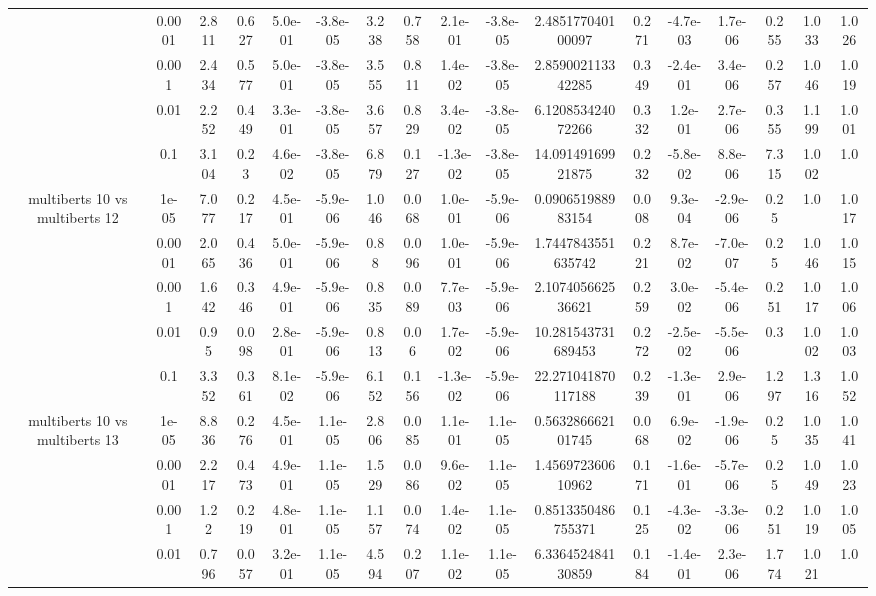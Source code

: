 \begin{tabular}{|c|c|c|c|c|c|c|c|c|c|c|c|c|c|c|c|c|}
 & 0.0001 & 2.811 & 0.627 & 5.0e-01 & -3.8e-05 & 3.238 & 0.758 & 2.1e-01 & -3.8e-05 & 2.485177040100097 & 0.271 & -4.7e-03 & 1.7e-06 & 0.255 & 1.033 & 1.026 \\
 & 0.001 & 2.434 & 0.577 & 5.0e-01 & -3.8e-05 & 3.555 & 0.811 & 1.4e-02 & -3.8e-05 & 2.859002113342285 & 0.349 & -2.4e-01 & 3.4e-06 & 0.257 & 1.046 & 1.019 \\
 & 0.01 & 2.252 & 0.449 & 3.3e-01 & -3.8e-05 & 3.657 & 0.829 & 3.4e-02 & -3.8e-05 & 6.120853424072266 & 0.332 & 1.2e-01 & 2.7e-06 & 0.355 & 1.199 & 1.001 \\
 & 0.1 & 3.104 & 0.23 & 4.6e-02 & -3.8e-05 & 6.879 & 0.127 & -1.3e-02 & -3.8e-05 & 14.09149169921875 & 0.232 & -5.8e-02 & 8.8e-06 & 7.315 & 1.002 & 1.0 \\
\hline
\multirow{5}{*}{multiberts 10 vs multiberts 12} & 1e-05 & 7.077 & 0.217 & 4.5e-01 & -5.9e-06 & 1.046 & 0.068 & 1.0e-01 & -5.9e-06 & 0.090651988983154 & 0.008 & 9.3e-04 & -2.9e-06 & 0.25 & 1.0 & 1.017 \\
 & 0.0001 & 2.065 & 0.436 & 5.0e-01 & -5.9e-06 & 0.88 & 0.096 & 1.0e-01 & -5.9e-06 & 1.7447843551635742 & 0.221 & 8.7e-02 & -7.0e-07 & 0.25 & 1.046 & 1.015 \\
 & 0.001 & 1.642 & 0.346 & 4.9e-01 & -5.9e-06 & 0.835 & 0.089 & 7.7e-03 & -5.9e-06 & 2.107405662536621 & 0.259 & 3.0e-02 & -5.4e-06 & 0.251 & 1.017 & 1.006 \\
 & 0.01 & 0.95 & 0.098 & 2.8e-01 & -5.9e-06 & 0.813 & 0.06 & 1.7e-02 & -5.9e-06 & 10.281543731689453 & 0.272 & -2.5e-02 & -5.5e-06 & 0.3 & 1.002 & 1.003 \\
 & 0.1 & 3.352 & 0.361 & 8.1e-02 & -5.9e-06 & 6.152 & 0.156 & -1.3e-02 & -5.9e-06 & 22.271041870117188 & 0.239 & -1.3e-01 & 2.9e-06 & 1.297 & 1.316 & 1.052 \\
\hline
\multirow{5}{*}{multiberts 10 vs multiberts 13} & 1e-05 & 8.836 & 0.276 & 4.5e-01 & 1.1e-05 & 2.806 & 0.085 & 1.1e-01 & 1.1e-05 & 0.563286662101745 & 0.068 & 6.9e-02 & -1.9e-06 & 0.25 & 1.035 & 1.041 \\
 & 0.0001 & 2.217 & 0.473 & 4.9e-01 & 1.1e-05 & 1.529 & 0.086 & 9.6e-02 & 1.1e-05 & 1.456972360610962 & 0.171 & -1.6e-01 & -5.7e-06 & 0.25 & 1.049 & 1.023 \\
 & 0.001 & 1.22 & 0.219 & 4.8e-01 & 1.1e-05 & 1.157 & 0.074 & 1.4e-02 & 1.1e-05 & 0.8513350486755371 & 0.125 & -4.3e-02 & -3.3e-06 & 0.251 & 1.019 & 1.005 \\
 & 0.01 & 0.796 & 0.057 & 3.2e-01 & 1.1e-05 & 4.594 & 0.207 & 1.1e-02 & 1.1e-05 & 6.336452484130859 & 0.184 & -1.4e-01 & 2.3e-06 & 1.774 & 1.021 & 1.0 \\

\end{tabular}
